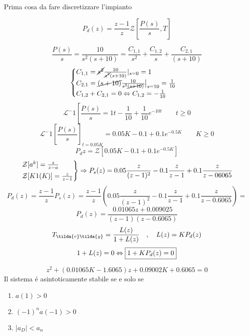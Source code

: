 \documentclass{article}
\begin{document}
Prima cosa da fare discretizzare l'impianto

\[ P_d(z) = \frac{z-1}{z} \mathcal{Z}\left[ \frac{P(s)}{s}, T\right] \]


\[ \frac{P(s)}{s} = \frac{10}{s^2 (s+10)} = \frac{C_{1,1}}{s^2} + \frac{C_{1,2}}{s} + \frac{C_{2,1}}{(s+10)} \]
\[
    \begin{cases}
        C_{1,1} = \cancel{s^2} \frac{10}{\cancel{s^2}(s+10)} |_{s=0} = 1\\
        C_{2,1} = \cancel{(s+10)} \frac{10}{s^2\cancel{(s+10)}} \big|_{s=10} = \frac{1}{10}\\
        C_{1,2} + C_{2,1} = 0 \Leftrightarrow C_{1,2} = -\frac{1}{10}
    \end{cases}
\]
\[\mathcal{L}^-1\left[ \frac{P(s)}{s} = 1t - \frac{1}{10} + \frac{1}{10} e^{-10t} \qquad t\ge 0 \]
\[ \mathcal{L}^-1\left[\frac{P(s)}{s}\right]_{t=0.05K} = 0.05K - 0.1 + 0.1 e^{-0.5K} \qquad K\ge 0\]
\[ P_d{z} = \mathcal{Z}\left[ 0.05K - 0.1 + 0.1 e^{-0.5K} \right]\]
\[
    \begin{rcases}
        \mathcal{Z}[a^k] = \frac{z}{z-a}\\
        \mathcal{Z}[K1(K)] = \frac{z}{z-1}
    \end{rcases} \Rightarrow P_s(z) = 0.05\frac{z}{(z-1)^2} -0.1 \frac{z}{z-1} + 0.1\frac{z}{z-06065}
\]
\[ P_d(z) = \frac{z-1}{z}P_s(z) = \frac{z-1}{z} \left( 0.05 \frac{z}{(z-1)^2} - 0.1\frac{z}{z-1} + 0.1 \frac{z}{z-0.6065}\right) = \]
\[P_d(z) = \frac{0.01065 z + 0.009025}{(z-1)(z-0.6065)}\]
\[ T_{\tilda{r}\tilda{y}} = \frac{L(z)}{1 + L(z)} \quad, \quad L(z) = KP_d(z) \]
\[ 1 + L(z) = 0 \Leftrightarrow \framebox{$1 + KP_d(z) = 0$}\]

\[ z^2 + (0.01065K - 1.6065)z + 0.09002K + 0.6065 = 0 \]
Il sistema \'e asintoticamente stabile se e solo se
\begin{enumerate}
    \item $a(1) > 0$
    \item $(-1)^n a(-1) > 0$
    \item $|a_D| < a_n$
\end{enumerate}
\end{document}
